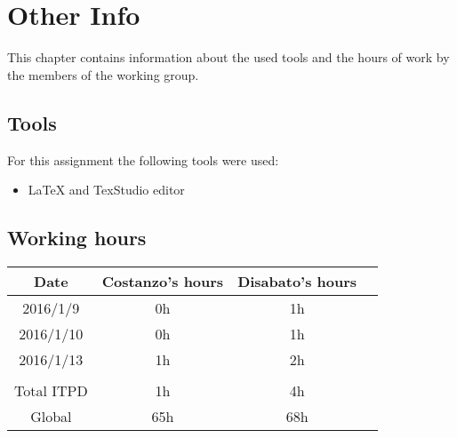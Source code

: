 \documentclass[\mainpath/main]{subfiles}
\begin{document}
\chapter{Other Info}
\label{OtherInfo}

\setmyfancystyle

This chapter contains information about the used tools and the hours of work by the members of the working group.

\section{Tools}
For this assignment the following tools were used:
\begin{itemize}
	\item \LaTeX{} and TexStudio editor
\end{itemize}

\section{Working hours}
\begin{table}[h!]
	\centering
\begin{tabular}{cccc}
\hline
Date       & Costanzo's hours & Disabato's hours  & \\ \hline
2016/1/9 & 0h 			  & 1h 			  & \\ \hline
2016/1/10 & 0h 			  & 1h 			  & \\ \hline
2016/1/13 & 1h 			  & 2h 			  & \\ \hline

\\
Total ITPD  & 1h 		      & 4h 			 	  & \\ \hline
Global 	   & 65h 		 	  & 68h 			  & \\ \hline

\end{tabular}
\end{table}
\end{document}
